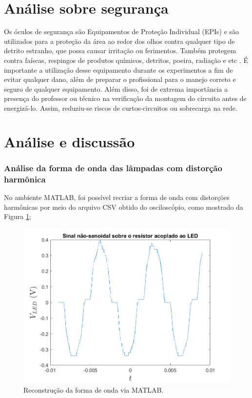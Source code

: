 \documentclass[a4paper,12pt,oneside,openany,table,xcdraw]{article}
\begin{document}
\section{Análise sobre segurança} %
Os óculos de segurança são Equipamentos de Proteção Individual (EPIs) e são utilizados para a proteção da área ao redor dos olhos contra qualquer tipo de detrito estranho, que possa causar irritação ou ferimentos. Também protegem contra faíscas, respingos de produtos químicos, detritos, poeira, radiação e etc \cite{safe}.
É importante a utilização desse equipamento durante os experimentos a fim de evitar qualquer dano, além de preparar o profissional para o manejo correto e seguro de qualquer equipamento.
Além disso, foi de extrema importância a presença do professor ou técnico na verificação da montagem do circuito antes de energizá-lo. Assim, reduziu-se riscos de curtos-circuitos ou sobrecarga na rede.

\vspace{0.2cm}
\section{Análise e discussão} %
\subsubsection{Análise da forma de onda das lâmpadas com distorção harmônica}
No ambiente MATLAB, foi possível recriar a forma de onda com distorções harmônicas por meio do arquivo CSV obtido do osciloscópio, como mostrado da Figura \ref{m1:matlab:image};

\vspace{0.6cm}
\begin{figure}[H]
\centering
\includegraphics[width=13cm]{Sinal_IN}
\caption{Reconstrução da forma de onda via MATLAB.}
\label{m1:matlab:image}
\end{figure}
\vspace{0.1cm}
\end{document}
